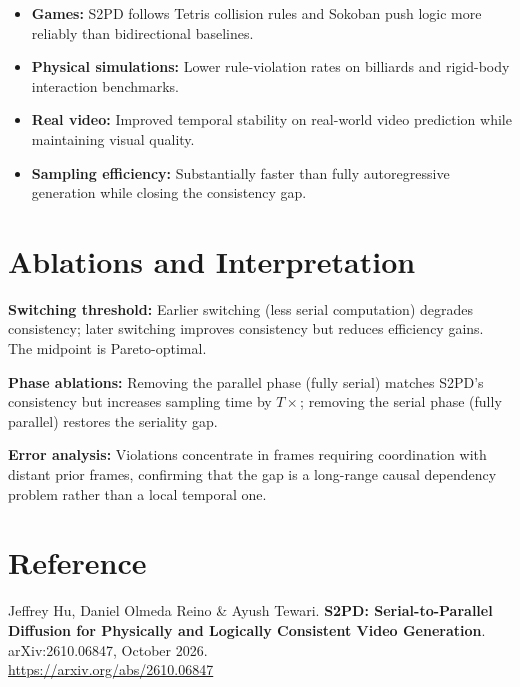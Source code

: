 \documentclass[10pt,twocolumn]{article}
\begin{document}
\begin{itemize}[itemsep=2pt,parsep=0pt]
  \item \textbf{Games:} S2PD follows Tetris collision rules and Sokoban push
    logic more reliably than bidirectional baselines.
  \item \textbf{Physical simulations:} Lower rule-violation rates on billiards
    and rigid-body interaction benchmarks.
  \item \textbf{Real video:} Improved temporal stability on real-world video
    prediction while maintaining visual quality.
  \item \textbf{Sampling efficiency:} Substantially faster than fully
    autoregressive generation while closing the consistency gap.
\end{itemize}

\section{Ablations and Interpretation}

\textbf{Switching threshold:} Earlier switching (less serial computation) degrades
consistency; later switching improves consistency but reduces efficiency gains.
The midpoint is Pareto-optimal.

\textbf{Phase ablations:} Removing the parallel phase (fully serial) matches
S2PD's consistency but increases sampling time by $T\times$; removing the
serial phase (fully parallel) restores the seriality gap.

\textbf{Error analysis:} Violations concentrate in frames requiring coordination
with distant prior frames, confirming that the gap is a long-range causal
dependency problem rather than a local temporal one.

\section*{Reference}

Jeffrey Hu, Daniel Olmeda Reino \& Ayush Tewari.
\textbf{S2PD: Serial-to-Parallel Diffusion for Physically and Logically
Consistent Video Generation}.
arXiv:2610.06847, October 2026.\\
\url{https://arxiv.org/abs/2610.06847}
\end{document}
